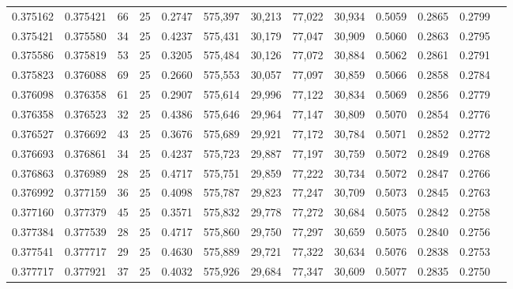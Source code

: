 \begin{tabular}{rrrrrrrrrrrrr}
0.375162 & 0.375421 &    66 &  25 &                                     0.2747 & 575,397 &  30,213 &  77,022 &  30,934 & 0.5059 & 0.2865 & 0.2799 \\
0.375421 & 0.375580 &    34 &  25 &                                     0.4237 & 575,431 &  30,179 &  77,047 &  30,909 & 0.5060 & 0.2863 & 0.2795 \\
0.375586 & 0.375819 &    53 &  25 &                                     0.3205 & 575,484 &  30,126 &  77,072 &  30,884 & 0.5062 & 0.2861 & 0.2791 \\
0.375823 & 0.376088 &    69 &  25 &                                     0.2660 & 575,553 &  30,057 &  77,097 &  30,859 & 0.5066 & 0.2858 & 0.2784 \\
0.376098 & 0.376358 &    61 &  25 &                                     0.2907 & 575,614 &  29,996 &  77,122 &  30,834 & 0.5069 & 0.2856 & 0.2779 \\
0.376358 & 0.376523 &    32 &  25 &                                     0.4386 & 575,646 &  29,964 &  77,147 &  30,809 & 0.5070 & 0.2854 & 0.2776 \\
0.376527 & 0.376692 &    43 &  25 &                                     0.3676 & 575,689 &  29,921 &  77,172 &  30,784 & 0.5071 & 0.2852 & 0.2772 \\
0.376693 & 0.376861 &    34 &  25 &                                     0.4237 & 575,723 &  29,887 &  77,197 &  30,759 & 0.5072 & 0.2849 & 0.2768 \\
0.376863 & 0.376989 &    28 &  25 &                                     0.4717 & 575,751 &  29,859 &  77,222 &  30,734 & 0.5072 & 0.2847 & 0.2766 \\
0.376992 & 0.377159 &    36 &  25 &                                     0.4098 & 575,787 &  29,823 &  77,247 &  30,709 & 0.5073 & 0.2845 & 0.2763 \\
0.377160 & 0.377379 &    45 &  25 &                                     0.3571 & 575,832 &  29,778 &  77,272 &  30,684 & 0.5075 & 0.2842 & 0.2758 \\
0.377384 & 0.377539 &    28 &  25 &                                     0.4717 & 575,860 &  29,750 &  77,297 &  30,659 & 0.5075 & 0.2840 & 0.2756 \\
0.377541 & 0.377717 &    29 &  25 &                                     0.4630 & 575,889 &  29,721 &  77,322 &  30,634 & 0.5076 & 0.2838 & 0.2753 \\
0.377717 & 0.377921 &    37 &  25 &                                     0.4032 & 575,926 &  29,684 &  77,347 &  30,609 & 0.5077 & 0.2835 & 0.2750 \\

\end{tabular}
